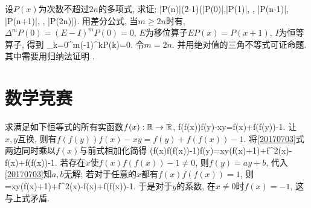 设$P(x)$为次数不超过$2n$的多项式, 求证:
\bee
|P(n)|\le(2-1)\max(|P(0)|,|P(1)|, \cdots, |P(n-1)|, |P(n+1)|, \cdots, |P(2n)|).
\eee
\eq
\ba
用差分公式, 当$m\ge2n$时有, $\Delta^mP(0)=(E-I)^mP(0)=0$, $E$为移位算子$EP(x)=P(x+1)$, $I$为恒等算子, 得到
\bee
\sum_{k=0}^{m}(-1)^kP(k)=0.
\eee
令$m=2n$. 并用绝对值的三角不等式可证命题. 其中需要用归纳法证明
\bee
{}\ge{}.
\eee
\ea


\section{数学竞赛}
\bq{}{}
求满足如下恒等式的所有实函数$f(x):\Bbb R\to\Bbb R$,
\be\label{20170703}
f(f(x))f(y)-xy=f(x)+f(f(y))-1.
\ee
\eq
\ba
让$x,y$互换, 则有$f(f(y))f(x)-xy=f(y)+f(f(x))-1$. 将\ref{20170703}式两边同时乘以$f(x)$与前式相加化简得
\bee
(f(x)f(f(x))-1)f(y)=xy(f(x)+1)+f^2(x)-f(x)+f(f(x))-1.
\eee
若存在$x$使$f(x)f(f(x))-1\ne0$, 则$f(y)=ay+b$, 代入\ref{20170703}知$a,b$无解;
若对于任意的$x$都有$f(x)f(f(x))=1$, 则
=xy(f(x)+1)+f^2(x)-f(x)+f(f(x))-1.
\eee
于是对于$y$的系数, 在$x\ne0$时$f(x)=-1$, 这与上式矛盾.
\ea
